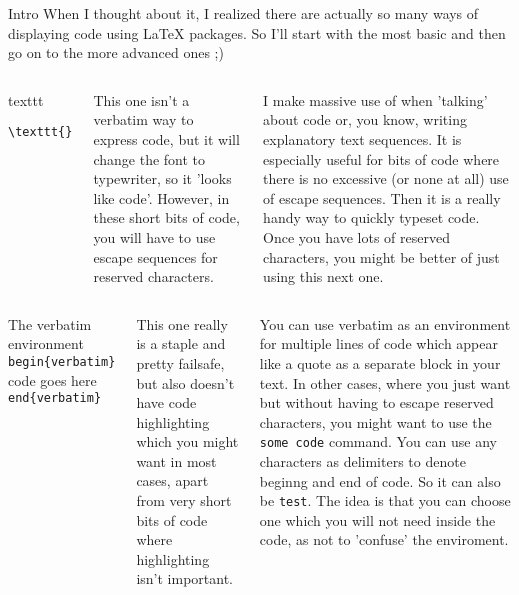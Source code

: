 \begin{frame}{Intro}
When I thought about it, I realized there are actually so many ways of displaying code using LaTeX packages. So I'll start with the most basic and then go on to the more advanced ones ;)
\framebreak

\begin{columns}[T,onlytextwidth]
\begin{exampleblock}{texttt}
\begin{verbatim}
\texttt{}
\end{verbatim}
\end{exampleblock}
\footnotesize
This one isn't a verbatim way to express code, but it will change the font to typewriter, so it 'looks like code'. However, in these short bits of code, you will have to use escape sequences for reserved characters.

I make massive use of \texttt{} when 'talking' about code or, you know, writing explanatory text sequences. It is especially useful for bits of code where there is no excessive (or none at all) use of escape sequences. Then it is a really handy way to quickly typeset code. Once you have lots of reserved characters, you might be better of just using this next one.
\end{columns}
\framebreak

\begin{columns}[T,onlytextwidth]
\begin{exampleblock}{The verbatim environment}
\texttt{\\begin\{verbatim\}}
    code goes here
\texttt{\\end\{verbatim\}}
\end{exampleblock}
\footnotesize
\alert{This one really is a staple} and pretty failsafe, but also doesn't have code highlighting which you might want in most cases, apart from very short bits of code where highlighting isn't important.

You can use verbatim as an environment for multiple lines of code which appear like a quote as a separate block in your text. In other cases, where you just want \texttt{} but without having to escape reserved characters, you might want to use the \verb|some code| command. You can use any characters as delimiters to denote beginng and end of code. So it can also be \verb+test+. The idea is that you can choose one which you will not need inside the code, as not to 'confuse' the enviroment.
\end{columns}
\end{frame}


